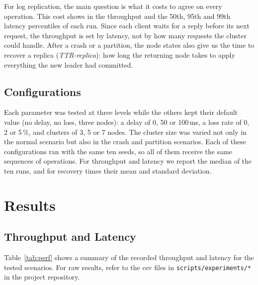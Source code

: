 \documentclass[conference]{IEEEtran}
\begin{document}
For log replication, the main question is what it costs to agree on every operation. This cost shows in the throughput and the 50th, 95th and 99th latency percentiles of each run.
Since each client waits for a reply before its next request, the throughput is set by latency, not by how many requests the cluster could handle. After a crash or a partition,
the node states also give us the time to recover a replica (\emph{TTR-replica}): how long the returning node takes to apply everything the new leader had committed.

\subsection{Configurations}\label{sec:method-config}
Each parameter was tested at three levels while the others kept their default value (no delay, no loss, three nodes): a delay of 0, 50 or 100\,ms, a loss rate of 0, 2 or 5\,\%,
and clusters of 3, 5 or 7 nodes. The cluster size was varied not only in the normal scenario but also in the crash and partition scenarios.
Each of these configurations ran with the same ten seeds, so all of them receive the same sequences of operations.
For throughput and latency we report the median of the ten runs, and for recovery times their mean and standard deviation.

\section{Results}
\label{sec:results}
\subsection{Throughput and Latency}

Table~\ref{tab:perf} shows a summary of the recorded throughput and latency for the tested scenarios. For raw results, refer to the csv files in \texttt{scripts/experiments/*} in the project repository.
\end{document}
